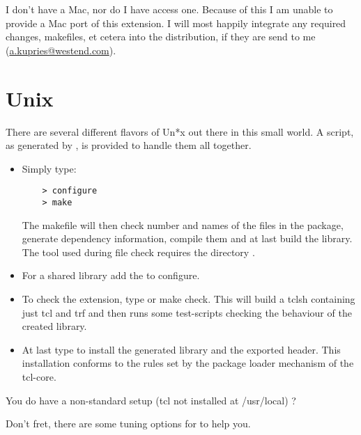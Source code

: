 	I don't have a Mac, nor do I have access one. Because
	of this I am unable to provide a Mac port of this
	extension.  I will most happily integrate any required
	changes, makefiles, et cetera into the distribution,
	if they are send to me (\url {a.kupries@westend.com}).


\section {Unix}

There are several different flavors of Un*x out there in this small
world. A  script, as generated by , is provided to handle them all together.

\begin {itemize}
\item	Simply type:

\begin{verbatim}
	> configure
	> make
\end{verbatim}

The makefile will then check number and names of the files in the
package, generate dependency information, compile them and at last
build the library.  The tool  used during file
check requires the directory .


\item	For a shared library add the  to \cmd
	{configure}. 


\item	To check the extension, type  or \cmd
	{make check}. This will build a tclsh containing just tcl and
	trf and then runs some test-scripts checking the behaviour of
	the created library. 

\item	At last type  to install the generated
	library and the exported header. This installation conforms to
	the rules set by the package loader mechanism of the tcl-core. 
\end {itemize}

You do have a non-standard setup (tcl not installed at \file
{/usr/local}) ?

Don't fret, there are some tuning options for  to help
you. 

